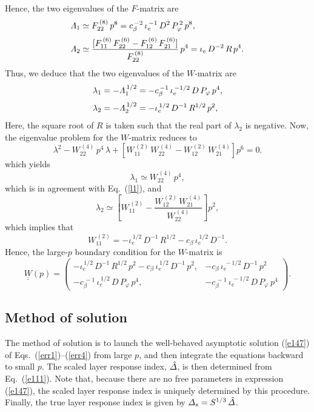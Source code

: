 \documentclass[12pt,prb,aps]{revtex4-1}
\begin{document}
Hence, the two eigenvalues of the $F$-matrix are
 \begin{align}
 {\mit\Lambda}_1&\simeq F_{22}^{\,(8)}\,p^8=  c_\beta^{\,-2}\,\iota_e^{\,-1}\,D^2\,P_\varphi^{\,2}\,p^8,\\[0.5ex]
 {\mit\Lambda}_2 &\simeq \frac{[F_{11}^{\,(6)}\,F_{22}^{\,(6)} - F_{12}^{\,(6)}\,F_{21}^{\,(6)}]}{F_{22}^{\,(8)}}\,p^4= \iota_e\,D^{-2}\,R\,p^4.
 \end{align}
 Thus, we deduce that the two eigenvalues of the $W$-matrix are 
 \begin{align}\label{l1}
 \lambda_1&=-{\mit\Lambda}_1^{\,1/2}= -c_\beta^{\,-1}\,\iota_e^{\,-1/2}\,D\,P_\varphi\,p^4,\\[0.5ex]
 \lambda_2&=-{\mit\Lambda}_2^{\,1/2}=-\iota_e^{\,1/2}\,D^{-1}\,R^{1/2}\,p^2,
 \end{align}
 Here, the square root of $R$ is taken such that the real part of $\lambda_2$ is negative. 
  Now, the eigenvalue problem for the $W$-matrix reduces to 
 \begin{equation}
 \lambda^{2} - W_{22}^{\,(4)}\,p^4\,\lambda + \left[W_{11}^{\,(2)}\,W_{22}^{\,(4)} - W_{12}^{\,(2)}\,W_{21}^{\,(4)}\right]p^6 = 0.
 \end{equation}
which yields
\begin{equation}
\lambda_1\simeq W_{22}^{\,(4)}\,p^4,
\end{equation}
which is in agreement with Eq.~(\ref{l1}), and
\begin{equation}
\lambda_2 \simeq \left[W_{11}^{\,(2)} - \frac{W_{12}^{\,(2)}\,W_{21}^{\,(4)}}{W_{22}^{\,(4)}}\right]p^2,
\end{equation}
 which implies that
 \begin{equation}
 W_{11}^{\,(2)} = -\iota_e^{\,1/2}\,D^{-1}\,R^{1/2}-c_\beta\,\iota_e^{\,1/2}\,D^{-1}.
 \end{equation}
 Hence, the large-$p$ boundary condition for the $W$-matrix
 is
 \begin{equation}\label{e147}
 \underline{\underline{W}}(p) =  \left(\begin{array}{cc} -\iota_e^{\,1/2}\,D^{-1}\,R^{1/2}\,p^2-c_\beta\,\iota_e^{\,1/2}\,D^{-1}\,p^2,& - c_\beta\,\iota_e^{\,-1/2}\,D^{-1}\,p^2\\-c_\beta^{\,-1}\,\iota_e^{\,1/2}\,D\,P_\varphi\,p^4,&-c_\beta^{\,-1}\,\iota_e^{\,-1/2}\,D\,P_\varphi\,p^4\end{array}\right).
 \end{equation}

\subsection{Method of solution}
The method of solution is to launch the well-behaved asymptotic solution (\ref{e147}) of Eqs.~(\ref{err1})--(\ref{err4}) from large $p$, and then
integrate the equations backward to small $p$. The scaled layer response index, $\hat{\mit\Delta}$, is then determined  from Eq.~(\ref{e111}). 
Note that, because there are no free parameters in expression (\ref{e147}), the scaled layer response index is uniquely determined by this procedure. 
Finally, the true layer response index is given by ${\mit\Delta}_s= S^{1/3}\,\hat{\mit\Delta}$. 
\end{document}
